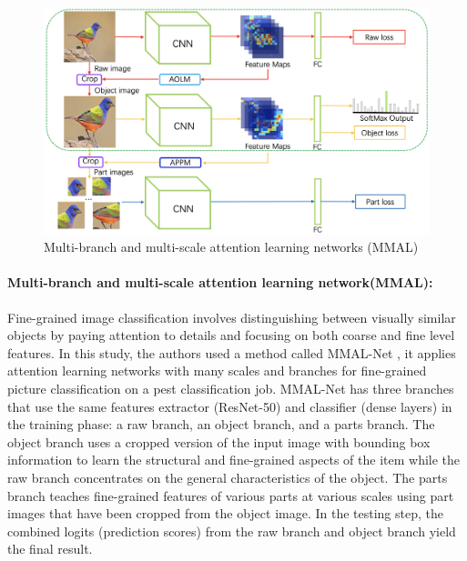 \begin{figure}[htb]
    \centering
    \includegraphics[scale=.35]{figures/mmal.png}
    \caption{Multi-branch and multi-scale attention learning networks (MMAL) \cite{ung2021efficient}}
    \label{fig:my_label}
\end{figure}

\paragraph{Multi-branch and multi-scale attention learning network(MMAL):}
Fine-grained image classification involves distinguishing between visually similar objects by paying attention to details and focusing on both coarse and fine level features. In this study, the authors used a method called MMAL-Net \cite{zhang2021multi}, it applies attention learning networks with many scales and branches for fine-grained picture classification on a pest classification job. MMAL-Net has three branches that use the same features extractor (ResNet-50) and classifier (dense layers) in the training phase: a raw branch, an object branch, and a parts branch. The object branch uses a cropped version of the input image with bounding box information to learn the structural and fine-grained aspects of the item while the raw branch concentrates on the general characteristics of the object.
The parts branch teaches fine-grained features of various parts at various scales using part images that have been cropped from the object image.
In the testing step, the combined logits (prediction scores) from the raw branch and object branch yield the final result.

